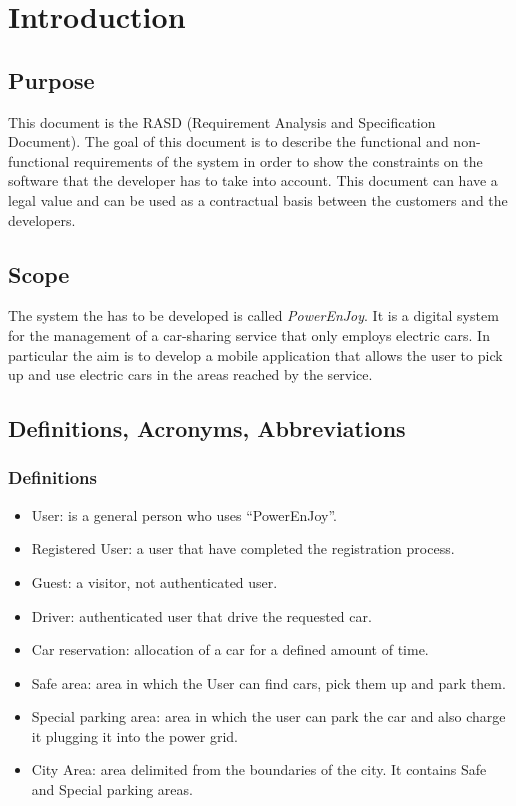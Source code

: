 
\section{Introduction}

\subsection{Purpose}
This document is the RASD (Requirement Analysis and Specification Document). The goal of this document is to describe the functional and non-functional requirements of the system in order to show the constraints on the software that the developer has to take into account. This document can have a legal value and can be used as a contractual basis between the customers and the developers.

\subsection{Scope}
The system the has to be developed is called \emph{PowerEnJoy}. It is a digital system for the management of a car-sharing service that only employs electric cars. In particular the aim is to develop a mobile application that allows the user to pick up and use electric cars in the areas reached by the service. 

\subsection{Definitions, Acronyms, Abbreviations}


\subsubsection{Definitions}
\begin{itemize}
	\item User: is a general person who uses ``PowerEnJoy''.
	\item Registered User: a user that have completed the registration process.
	\item Guest: a visitor, not authenticated user.
	\item Driver: authenticated user that drive the requested car.
	\item Car reservation: allocation of a car for a defined amount of time.
	\item Safe area: area in which the User can find cars, pick them up and park them.
	\item Special parking area: area in which the user can park the car and also charge it plugging it into the power grid. 
	\item City Area: area delimited from the boundaries of the city. It contains Safe and Special parking areas.

	
\end{itemize}

